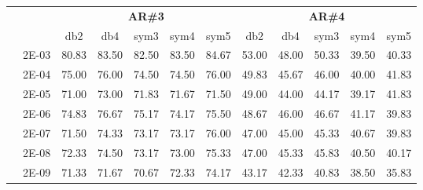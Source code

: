 \begin{table}[H]
\begin{tabular}{|c|c|c c c c c|c c c c c|}
\cline{3-12}
\multicolumn{2}{c}{} & \multicolumn{5}{|c|}{\textbf{AR\#3}}  & \multicolumn{5}{c|}{\textbf{AR\#4}} \\\cline{3-12}
\multicolumn{2}{c}{}  & \multicolumn{1}{|c}{db2} & db4 & sym3 & sym4 & sym5 & db2 & db4& sym3 & sym4 & sym5 \\\hline
\multicolumn{1}{|c|}{ \multirow{6}{*}{\rotatebox[origin=c]{90}{\textbf{Gamma}}} }
&2E-03&	80.83&	83.50&	82.50&	83.50&	84.67&	53.00	&48.00&	50.33&	39.50&	40.33	\\\cline{2-12}
&2E-04&	75.00&	76.00&	74.50&	74.50&	76.00&	49.83	&45.67&	46.00&	40.00&	41.83	\\\cline{2-12}
&2E-05&	71.00&	73.00&	71.83&	71.67&	71.50&	49.00	&44.00&	44.17&	39.17&	41.83	\\\cline{2-12}
&2E-06&	74.83&	76.67&	75.17&	74.17&	75.50&	48.67	&46.00&	46.67&	41.17&	39.83	\\\cline{2-12}
&2E-07&	71.50&	74.33&	73.17&	73.17&	76.00&	47.00	&45.00&	45.33&	40.67&	39.83	\\\cline{2-12}
&2E-08&	72.33&	74.50&	73.17&	73.00&	75.33&	47.00	&45.33&	45.83&	40.50&	40.17	\\\cline{2-12}
&2E-09&	71.33&	71.67&	70.67&	72.33&	74.17&	43.17	&42.33&	40.83&	38.50&	35.83	
	
	
\\\midrule
\end{tabular}

\end{table}



